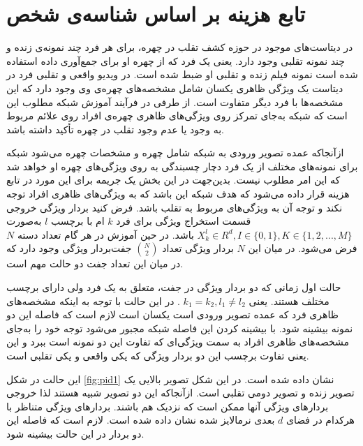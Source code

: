 \section{تابع هزینه بر اساس شناسه‌ی شخص}
در دیتاست‌های موجود در حوزه کشف تقلب در چهره، برای هر فرد چند نمونه‌ی زنده و چند نمونه تقلبی وجود دارد. یعنی یک فرد که از چهره او برای جمع‌آوری داده استفاده شده است نمونه فیلم زنده و تقلبی او ضبط شده است. در ویدیو واقعی و تقلبی فرد در دیتاست یک ویژگی ظاهری یکسان شامل مشخصه‌های چهره‌ی وی وجود دارد که این مشخصه‌ها با فرد دیگر متفاوت است. از طرفی در فرآیند آموزش شبکه مطلوب این است که شبکه به‌جای تمرکز روی ویژگی‌های ظاهری چهره‌ی افراد روی علائم مربوط به وجود یا عدم وجود تقلب در چهره تأکید داشته باشد.

از‌آنجا‌که عمده تصویر ورودی به شبکه شامل چهره و مشخصات چهره می‌شود شبکه برای نمونه‌های مختلف از یک فرد دچار چسبندگی به روی ویژگی‌های چهره او خواهد شد که این امر مطلوب نیست.       
بدین‌جهت در این بخش یک جریمه برای این مورد در تابع هزینه قرار داده می‌شود که هدف شبکه این باشد که به ویژگی‌های ظاهری افراد توجه نکند و توجه آن به ویژگی‌های مربوط به تقلب باشد. فرض کنید بردار ویژگی خروجی قسمت استخراج ویژگی برای فرد $k$ ام با برچسب $l$ به‌صورت 
$X_k^l \in R^d , I \in \{0,1\}, K \in \{1,2,...,M\}$
 باشد.
در حین آموزش در هر گام تعداد دسته
 $N$ 
فرض می‌شود. در میان این $N$ بردار ویژگی تعداد 
${N\choose 2}$
  جفت‌بردار ویژگی وجود دارد که در میان این تعداد جفت دو حالت مهم است.
  
  حالت اول زمانی که دو بردار ویژگی در جفت، متعلق به یک فرد ولی دارای برچسب مختلف هستند. یعنی 
  $k_1=k_2 , l_1 \ne l_2 $
. در این حالت با توجه به اینکه مشخصه‌های ظاهری فرد که عمده تصویر ورودی است یکسان است لازم است که فاصله این دو نمونه بیشینه شود. با بیشینه کردن این فاصله شبکه مجبور می‌شود توجه خود را به‌جای مشخصه‌های ظاهری افراد به سمت ویژگی‌ای که تفاوت این دو نمونه است ببرد و این یعنی تفاوت برچسب این دو بردار ویژگی که یکی واقعی و یکی تقلبی است. 
  
  این حالت در شکل
\ref{fig:pid1}
نشان داده شده است. در این شکل تصویر بالایی یک تصویر زنده و تصویر دومی تقلبی است. از‌آنجا‌که این دو تصویر شبیه هستند لذا خروجی بردارهای ویژگی آنها ممکن است که نزدیک هم باشند. بردارهای ویژگی متناظر با هر‌کدام در فضای $d$ بعدی نرمالایز شده نشان داده شده‌ است. لازم است که فاصله این دو بردار در این حالت بیشینه شود.
  
